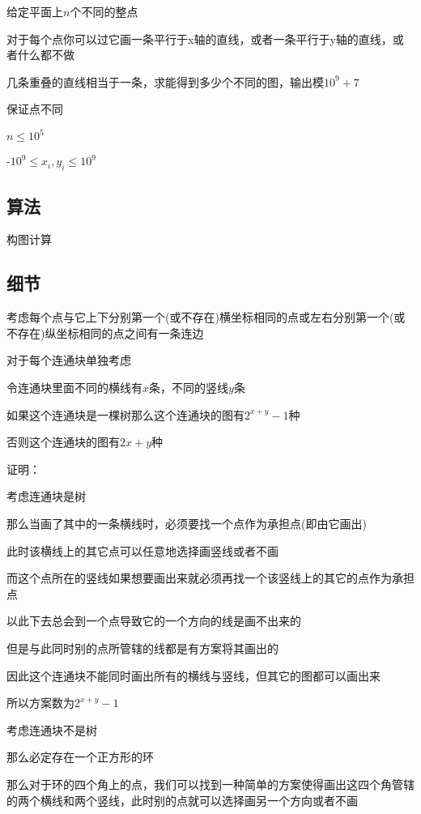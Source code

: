 \documentclass[a4paper]{article}
\begin{document}
		给定平面上$n$个不同的整点
		
		对于每个点你可以过它画一条平行于x轴的直线，或者一条平行于y轴的直线，或者什么都不做
		
		几条重叠的直线相当于一条，求能得到多少个不同的图，输出模$10^9+7$
		
		保证点不同
		
		$n \leq 10^5$
		
		-$10^9 \leq x_i , y_i \leq 10^9$
		
	\subsection{算法}
		
		构图计算
		
	\subsection{细节}
		
		考虑每个点与它上下分别第一个(或不存在)横坐标相同的点或左右分别第一个(或不存在)纵坐标相同的点之间有一条连边
		
		对于每个连通块单独考虑
		
		令连通块里面不同的横线有$x$条，不同的竖线$y$条
		
		如果这个连通块是一棵树那么这个连通块的图有$2^{x + y} - 1$种
		
		否则这个连通块的图有$2{x + y}$种
		
		证明：
		
		考虑连通块是树
		
		那么当画了其中的一条横线时，必须要找一个点作为承担点(即由它画出)
		
		此时该横线上的其它点可以任意地选择画竖线或者不画
		
		而这个点所在的竖线如果想要画出来就必须再找一个该竖线上的其它的点作为承担点
		
		以此下去总会到一个点导致它的一个方向的线是画不出来的
		
		但是与此同时别的点所管辖的线都是有方案将其画出的
		
		因此这个连通块不能同时画出所有的横线与竖线，但其它的图都可以画出来
		
		所以方案数为$2^{x+y}-1$
		
		考虑连通块不是树
		
		那么必定存在一个正方形的环
		
		那么对于环的四个角上的点，我们可以找到一种简单的方案使得画出这四个角管辖的两个横线和两个竖线，此时别的点就可以选择画另一个方向或者不画
		
\end{document}
